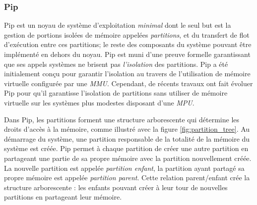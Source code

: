 			\subsubsection{Pip}
	\label{sec:pip}

	Pip est un noyau de système d'exploitation \emph{minimal} dont le seul but est la gestion de portions isolées de mémoire appelées \emph{partitions}, et du transfert de flot d'exécution entre ces partitions; le reste des composants du système pouvant être implémenté en dehors du noyau. Pip est muni d'une preuve formelle garantissant que ses appels systèmes ne brisent pas \emph{l'isolation} des partitions. Pip a été initialement conçu pour garantir l'isolation au travers de l'utilisation de mémoire virtuelle configurée par une \emph{MMU}. Cependant, de récents travaux \cite{dejon2022mmu} ont fait évoluer Pip pour qu'il garantisse l'isolation de partitions sans utiliser de mémoire virtuelle sur les systèmes plus modestes disposant d'une \emph{MPU}.

	Dans Pip, les partitions forment une structure arborescente qui détermine les droits d'accès à la mémoire, comme illustré avec la figure \ref{fig:partition_tree}. Au démarrage du système, une partition responsable de la totalité de la mémoire du système est créée. Pip permet à chaque partition de créer une autre partition en partageant une partie de sa propre mémoire avec la partition nouvellement créée. La nouvelle partition est appelée \emph{partition enfant}, la partition ayant partagé sa propre mémoire est appelée \emph{partition parent}. Cette relation parent/enfant crée la structure arborescente : les enfants pouvant créer à leur tour de nouvelles partitions en partageant leur mémoire.

	\begin{figure}[!ht]
	\end{figure}

	

